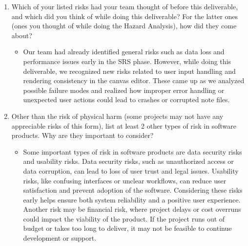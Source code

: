 \documentclass{article}
\begin{document}
\begin{enumerate}
\begin{itemize}
    \end{itemize} 
    \item Which of your listed risks had your team thought of before this
    deliverable, and which did you think of while doing this deliverable? For
    the latter ones (ones you thought of while doing the Hazard Analysis), how
    did they come about?
    \begin{itemize}
        \item Our team had already identified general risks such as 
        data loss and performance issues early in the SRS phase. However, while 
        doing this deliverable, we recognized new risks related to user input 
        handling and rendering consistency in the canvas editor. These came up 
        as we analyzed possible failure modes and realized how improper error 
        handling or unexpected user actions could lead to crashes or corrupted note files. 
    \end{itemize} 
    \item Other than the risk of physical harm (some projects may not have any
    appreciable risks of this form), list at least 2 other types of risk in
    software products. Why are they important to consider?
    \begin{itemize}
        \item Some important types of risk in software products are data security 
        risks and usability risks. Data security risks, such as unauthorized access or data 
        corruption, can lead to loss of user trust and legal issues. Usability risks, like 
        confusing interfaces or unclear workflows, can reduce user satisfaction and prevent 
        adoption of the software. Considering these risks early helps ensure both system 
        reliability and a positive user experience. Another risk may be financial risk, 
        where project delays or cost overruns could impact the viability of the product.
        If the project runs out of budget or takes too long to deliver, it may not be
        feasible to continue development or support.
    \end{itemize} 
\end{enumerate}
\end{document}
